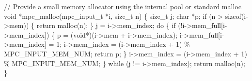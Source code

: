 \documentclass[
  a4paper,
]{scrreprt}
\newenvironment{Shaded}{\begin{snugshade}}{\end{snugshade}}
\newcommand{\CommentTok}[1]{\textcolor[rgb]{0.41,0.41,0.41}{#1}}
\newcommand{\ControlFlowTok}[1]{\textcolor[rgb]{0.85,0.12,0.09}{#1}}
\newcommand{\DataTypeTok}[1]{\textcolor[rgb]{0.47,0.16,0.63}{#1}}
\newcommand{\DecValTok}[1]{\textcolor[rgb]{0.47,0.16,0.63}{#1}}
\newcommand{\KeywordTok}[1]{\textcolor[rgb]{0.85,0.12,0.09}{#1}}
\newcommand{\NormalTok}[1]{\textcolor[rgb]{0.33,0.33,0.33}{#1}}
\newcommand{\OperatorTok}[1]{\textcolor[rgb]{0.00,0.46,0.62}{#1}}
\theoremstyle{definition}
\theoremstyle{remark}
\begin{document}
\begin{Shaded}
\begin{Highlighting}[numbers=left,,]
\CommentTok{// Provide a small memory allocator using the internal pool or standard malloc}
\DataTypeTok{void} \OperatorTok{*}\NormalTok{mpc\_malloc}\OperatorTok{(}\NormalTok{mpc\_input\_t }\OperatorTok{*}\NormalTok{i}\OperatorTok{,} \DataTypeTok{size\_t}\NormalTok{ n}\OperatorTok{)} \OperatorTok{\{}
  \DataTypeTok{size\_t}\NormalTok{ j}\OperatorTok{;}
  \DataTypeTok{char} \OperatorTok{*}\NormalTok{p}\OperatorTok{;}
  \ControlFlowTok{if} \OperatorTok{(}\NormalTok{n }\OperatorTok{\textgreater{}} \KeywordTok{sizeof}\OperatorTok{(}\NormalTok{i}\OperatorTok{{-}\textgreater{}}\NormalTok{mem}\OperatorTok{))} \OperatorTok{\{}
    \ControlFlowTok{return}\NormalTok{ malloc}\OperatorTok{(}\NormalTok{n}\OperatorTok{);}
  \OperatorTok{\}}
\NormalTok{  j }\OperatorTok{=}\NormalTok{ i}\OperatorTok{{-}\textgreater{}}\NormalTok{mem\_index}\OperatorTok{;}
  \ControlFlowTok{do} \OperatorTok{\{}
    \ControlFlowTok{if} \OperatorTok{(!}\NormalTok{i}\OperatorTok{{-}\textgreater{}}\NormalTok{mem\_full}\OperatorTok{[}\NormalTok{i}\OperatorTok{{-}\textgreater{}}\NormalTok{mem\_index}\OperatorTok{])} \OperatorTok{\{}
\NormalTok{      p }\OperatorTok{=} \OperatorTok{(}\DataTypeTok{void}\OperatorTok{*)(}\NormalTok{i}\OperatorTok{{-}\textgreater{}}\NormalTok{mem }\OperatorTok{+}\NormalTok{ i}\OperatorTok{{-}\textgreater{}}\NormalTok{mem\_index}\OperatorTok{);}
\NormalTok{      i}\OperatorTok{{-}\textgreater{}}\NormalTok{mem\_full}\OperatorTok{[}\NormalTok{i}\OperatorTok{{-}\textgreater{}}\NormalTok{mem\_index}\OperatorTok{]} \OperatorTok{=} \DecValTok{1}\OperatorTok{;}
\NormalTok{      i}\OperatorTok{{-}\textgreater{}}\NormalTok{mem\_index }\OperatorTok{=} \OperatorTok{(}\NormalTok{i}\OperatorTok{{-}\textgreater{}}\NormalTok{mem\_index }\OperatorTok{+} \DecValTok{1}\OperatorTok{)} \OperatorTok{\%}\NormalTok{ MPC\_INPUT\_MEM\_NUM}\OperatorTok{;}
      \ControlFlowTok{return}\NormalTok{ p}\OperatorTok{;}
    \OperatorTok{\}}
\NormalTok{    i}\OperatorTok{{-}\textgreater{}}\NormalTok{mem\_index }\OperatorTok{=} \OperatorTok{(}\NormalTok{i}\OperatorTok{{-}\textgreater{}}\NormalTok{mem\_index }\OperatorTok{+} \DecValTok{1}\OperatorTok{)} \OperatorTok{\%}\NormalTok{ MPC\_INPUT\_MEM\_NUM}\OperatorTok{;}
  \OperatorTok{\}} \ControlFlowTok{while} \OperatorTok{(}\NormalTok{j }\OperatorTok{!=}\NormalTok{ i}\OperatorTok{{-}\textgreater{}}\NormalTok{mem\_index}\OperatorTok{);}
  \ControlFlowTok{return}\NormalTok{ malloc}\OperatorTok{(}\NormalTok{n}\OperatorTok{);}
\OperatorTok{\}}


\end{Highlighting}
\end{Shaded}
\end{document}
